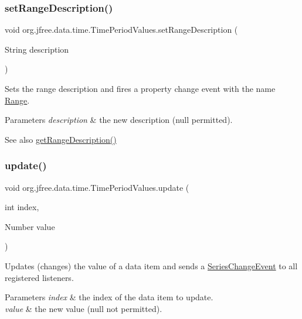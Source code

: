 \subsubsection{\texorpdfstring{set\+Range\+Description()}{setRangeDescription()}}
{\footnotesize\ttfamily void org.\+jfree.\+data.\+time.\+Time\+Period\+Values.\+set\+Range\+Description (\begin{DoxyParamCaption}\item[{String}]{description }\end{DoxyParamCaption})}

Sets the range description and fires a property change event with the name {\ttfamily \mbox{\hyperlink{classorg_1_1jfree_1_1data_1_1_range}{Range}}}.


\begin{DoxyParams}{Parameters}
{\em description} & the new description ({\ttfamily null} permitted).\\
\hline
\end{DoxyParams}
\begin{DoxySeeAlso}{See also}
\mbox{\hyperlink{classorg_1_1jfree_1_1data_1_1time_1_1_time_period_values_a7339bc03c769eac3b89517378667b94a}{get\+Range\+Description()}} 
\end{DoxySeeAlso}
\mbox{\label{classorg_1_1jfree_1_1data_1_1time_1_1_time_period_values_a96e95a2c4faf28624e3288fdeb9e86a2}} 
\subsubsection{\texorpdfstring{update()}{update()}}
{\footnotesize\ttfamily void org.\+jfree.\+data.\+time.\+Time\+Period\+Values.\+update (\begin{DoxyParamCaption}\item[{int}]{index,  }\item[{Number}]{value }\end{DoxyParamCaption})}

Updates (changes) the value of a data item and sends a \mbox{\hyperlink{}{Series\+Change\+Event}} to all registered listeners.


\begin{DoxyParams}{Parameters}
{\em index} & the index of the data item to update. \\
\hline
{\em value} & the new value ({\ttfamily null} not permitted). \\
\hline
\end{DoxyParams}


